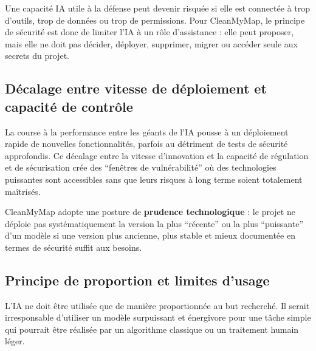 \documentclass[
  10pt,
  a4paper,
  DIV=11,
  numbers=noendperiod,
  oneside]{scrreprt}
\let\oldtextbf\textbf
\renewcommand{\textbf}[1]{\oldtextbf{\textcolor{cmmnavy}{#1}}}
\begin{document}
\begin{tcolorbox}[enhanced jigsaw, arc=.35mm, bottomrule=.15mm, bottomtitle=1mm, breakable, colback=white, colbacktitle=quarto-callout-warning-color!10!white, colframe=quarto-callout-warning-color-frame, coltitle=black, left=2mm, leftrule=.75mm, opacityback=0, opacitybacktitle=0.6, rightrule=.15mm, title=\textcolor{quarto-callout-warning-color}{\faExclamationTriangle}\hspace{0.5em}{Warning}, titlerule=0mm, toprule=.15mm, toptitle=1mm]

Une capacité IA utile à la défense peut devenir risquée si elle est
connectée à trop d'outils, trop de données ou trop de permissions. Pour
CleanMyMap, le principe de sécurité est donc de limiter l'IA à un rôle
d'assistance : elle peut proposer, mais elle ne doit pas décider,
déployer, supprimer, migrer ou accéder seule aux secrets du projet.

\end{tcolorbox}

\subsection{Décalage entre vitesse de déploiement et capacité de
contrôle}\label{duxe9calage-entre-vitesse-de-duxe9ploiement-et-capacituxe9-de-contruxf4le}

La course à la performance entre les géants de l'IA pousse à un
déploiement rapide de nouvelles fonctionnalités, parfois au détriment de
tests de sécurité approfondis. Ce décalage entre la vitesse d'innovation
et la capacité de régulation et de sécurisation crée des ``fenêtres de
vulnérabilité'' où des technologies puissantes sont accessibles sans que
leurs risques à long terme soient totalement maîtrisés.

CleanMyMap adopte une posture de \textbf{prudence technologique} : le
projet ne déploie pas systématiquement la version la plus ``récente'' ou
la plus ``puissante'' d'un modèle si une version plus ancienne, plus
stable et mieux documentée en termes de sécurité suffit aux besoins.

\subsection{Principe de proportion et limites
d'usage}\label{principe-de-proportion-et-limites-dusage}

L'IA ne doit être utilisée que de manière proportionnée au but
recherché. Il serait irresponsable d'utiliser un modèle surpuissant et
énergivore pour une tâche simple qui pourrait être réalisée par un
algorithme classique ou un traitement humain léger.
\end{document}
